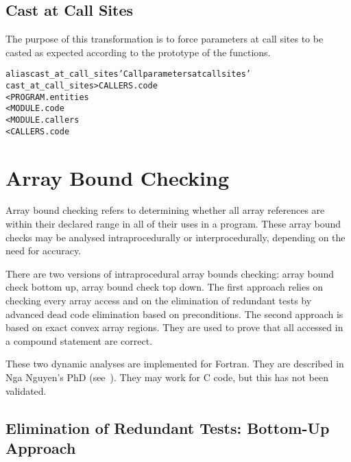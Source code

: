 \documentclass[a4paper]{report}
\newenvironment{PipsMake}{\begin{alltt}}{\end{alltt}}
\newenvironment{PipsPass}[1]{\label{pass:#1}}{}
\begin{document}
\subsection{Cast at Call Sites}

\begin{PipsPass}{cast_at_call_sites}
The purpose of this transformation is to force parameters at call sites to be
casted as expected according to the prototype of the functions.
\end{PipsPass}



\begin{PipsMake}
alias cast_at_call_sites 'Call parameters at call sites'
cast_at_call_sites > CALLERS.code
        < PROGRAM.entities
        < MODULE.code
        < MODULE.callers
        < CALLERS.code
\end{PipsMake}




\section{Array Bound Checking}
\label{subsection-array-bound-checking}

Array bound checking refers to determining whether all array references
are within their declared range in all of their uses in a program. These
array  bound checks may be analysed intraprocedurally or
interprocedurally, depending on the need for accuracy.

There are two versions of intraprocedural array bounds checking: array
bound check bottom up, array bound check top down. The first approach
relies on checking every array access and on the elimination of
redundant tests by advanced dead code elimination based on
preconditions. The second approach is based on exact convex array
regions. They are used to prove that all accessed in a compound
statement are correct.

These two dynamic analyses are implemented for Fortran. They are
described in Nga Nguyen's PhD (see~\cite{Ngu02}). They
may work for C code, but this has not been validated.


\subsection{Elimination of Redundant Tests: Bottom-Up Approach}
\label{subsection-array-bound-check_bottom_up}
\end{document}
